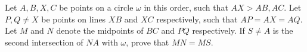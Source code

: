 Let $A,B,X,C$ be points on a circle $\omega$ in this order, such that $AX > AB, AC$.
Let $P, Q \neq X$ be points on lines $XB$ and $XC$ respectively, such that $AP = AX = AQ$.
Let $M$ and $N$ denote the midpoints of $BC$ and $PQ$ respectively.
If $S \neq A$ is the second intersection of $NA$ with $\omega$, prove that $MN = MS$.
